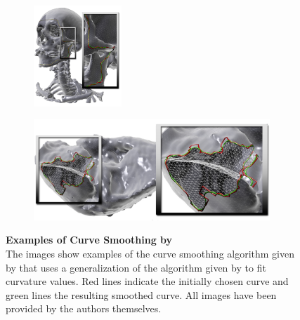 \documentclass{stdlocal}
\begin{document}
\begin{figure}[t]
  \centering
  \begin{subfigure}[b]{0.29\linewidth}
    \centering
    \includegraphics[height=3.8cm]{images/lawonn2014-1.png}
  \end{subfigure}
  \begin{subfigure}[b]{0.69\linewidth}
    \centering
    \includegraphics[height=3.8cm]{images/lawonn2014-2.png}
  \end{subfigure}
  \caption[Examples of Curve Smoothing by \textcite{lawonn2014}]{%
    \textbf{Examples of Curve Smoothing by \textcite{lawonn2014}}\\
    The images show examples of the curve smoothing algorithm given by \textcite{lawonn2014} that uses a generalization of the algorithm given by \textcite{martinez2005} to fit curvature values.
    Red lines indicate the initially chosen curve and green lines the resulting smoothed curve.
    All images have been provided by the authors themselves.
  }
  \label{fig:lawonn2014}
\end{figure}
\end{document}
